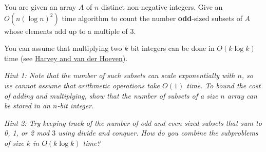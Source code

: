 \documentclass[11pt]{article}
\begin{document}
You are given an array $A$ of $n$ distinct non-negative integers. Give an $O(n (\log n)^2)$ time algorithm to count the number {\bf odd}-sized subsets of $A$ whose elements add up to a multiple of $3$. 

You can assume that multiplying two $k$ bit integers can be done in $O(k \log k)$ time (see \href{https://annals.math.princeton.edu/2021/193-2/p04}{Harvey and van der Hoeven}). 

\emph{Hint 1: Note that the number of such subsets can scale exponentially with $n$, so we cannot assume that arithmetic operations take $O(1)$ time. To bound the cost of adding and multiplying, show that the number of subsets of a size $n$ array can be stored in an $n$-bit integer.} 

\emph{Hint 2: Try keeping track of the number of odd and even sized subsets that sum to 0, 1, or 2 mod $3$ using divide and conquer. How do you combine the subproblems of size $k$ in $O(k \log k)$ time?}
\end{document}

